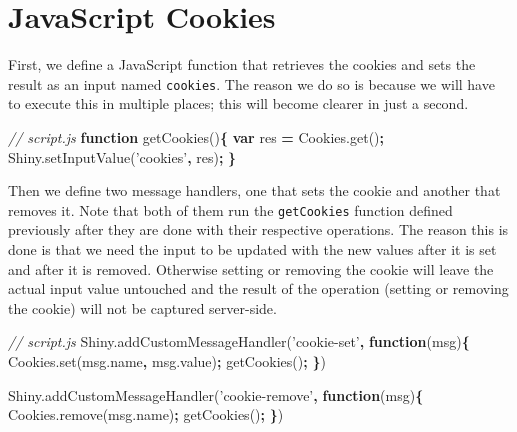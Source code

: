 \documentclass[10pt,]{krantz}
\makeatletter
\newenvironment{Shaded}{\begin{snugshade}}{\end{snugshade}}
\newcommand{\AttributeTok}[1]{\textcolor[rgb]{0.61,0.61,0.61}{#1}}
\newcommand{\CommentTok}[1]{\textcolor[rgb]{0.37,0.37,0.37}{\textit{#1}}}
\newcommand{\KeywordTok}[1]{\textcolor[rgb]{0.27,0.27,0.27}{\textbf{#1}}}
\newcommand{\NormalTok}[1]{#1}
\newcommand{\OperatorTok}[1]{\textcolor[rgb]{0.43,0.43,0.43}{\textbf{#1}}}
\newcommand{\StringTok}[1]{\textcolor[rgb]{0.5,0.5,0.5}{#1}}
\newcommand{\VariableTok}[1]{\textcolor[rgb]{0,0,0}{#1}}
\newenvironment{kframe}{%
\medskip{}
\setlength{\fboxsep}{.8em}
 \def\at@end@of@kframe{}%
 \ifinner\ifhmode%
  \def\at@end@of@kframe{\end{minipage}}%
  \begin{minipage}{\columnwidth}%
 \fi\fi%
 \def\FrameCommand##1{\hskip\@totalleftmargin \hskip-\fboxsep
 \colorbox{shadecolor}{##1}\hskip-\fboxsep
     \hskip-\linewidth \hskip-\@totalleftmargin \hskip\columnwidth}%
 \MakeFramed {\advance\hsize-\width
   \@totalleftmargin\z@ \linewidth\hsize
   \@setminipage}}%
 {\par\unskip\endMakeFramed%
 \at@end@of@kframe}
\renewenvironment{Shaded}{\begin{kframe}}{\end{kframe}}
\makeatother
\begin{document}
\hypertarget{shiny-cookies-javascript}{%
\section{JavaScript Cookies}\label{shiny-cookies-javascript}}

First, we define a JavaScript function that retrieves the cookies and sets the result as an input named \texttt{cookies}. The reason we do so is because we will have to execute this in multiple places; this will become clearer in just a second.

\begin{Shaded}
\begin{Highlighting}[]
\CommentTok{// script.js}
\KeywordTok{function} \AttributeTok{getCookies}\NormalTok{()}\OperatorTok{\{}
  \KeywordTok{var}\NormalTok{ res }\OperatorTok{=} \VariableTok{Cookies}\NormalTok{.}\AttributeTok{get}\NormalTok{()}\OperatorTok{;}
  \VariableTok{Shiny}\NormalTok{.}\AttributeTok{setInputValue}\NormalTok{(}\StringTok{'cookies'}\OperatorTok{,}\NormalTok{ res)}\OperatorTok{;}
\OperatorTok{\}}
\end{Highlighting}
\end{Shaded}

Then we define two message handlers, one that sets the cookie and another that removes it. Note that both of them run the \texttt{getCookies} function defined previously after they are done with their respective operations. The reason this is done is that we need the input to be updated with the new values after it is set and after it is removed. Otherwise setting or removing the cookie will leave the actual input value untouched and the result of the operation (setting or removing the cookie) will not be captured server-side.

\begin{Shaded}
\begin{Highlighting}[]
\CommentTok{// script.js}
\VariableTok{Shiny}\NormalTok{.}\AttributeTok{addCustomMessageHandler}\NormalTok{(}\StringTok{'cookie-set'}\OperatorTok{,} \KeywordTok{function}\NormalTok{(msg)}\OperatorTok{\{}
  \VariableTok{Cookies}\NormalTok{.}\AttributeTok{set}\NormalTok{(}\VariableTok{msg}\NormalTok{.}\AttributeTok{name}\OperatorTok{,} \VariableTok{msg}\NormalTok{.}\AttributeTok{value}\NormalTok{)}\OperatorTok{;}
  \AttributeTok{getCookies}\NormalTok{()}\OperatorTok{;}
\OperatorTok{\}}\NormalTok{)}

\VariableTok{Shiny}\NormalTok{.}\AttributeTok{addCustomMessageHandler}\NormalTok{(}\StringTok{'cookie-remove'}\OperatorTok{,} \KeywordTok{function}\NormalTok{(msg)}\OperatorTok{\{}
  \VariableTok{Cookies}\NormalTok{.}\AttributeTok{remove}\NormalTok{(}\VariableTok{msg}\NormalTok{.}\AttributeTok{name}\NormalTok{)}\OperatorTok{;}
  \AttributeTok{getCookies}\NormalTok{()}\OperatorTok{;}
\OperatorTok{\}}\NormalTok{)}
\end{Highlighting}
\end{Shaded}
\end{document}
